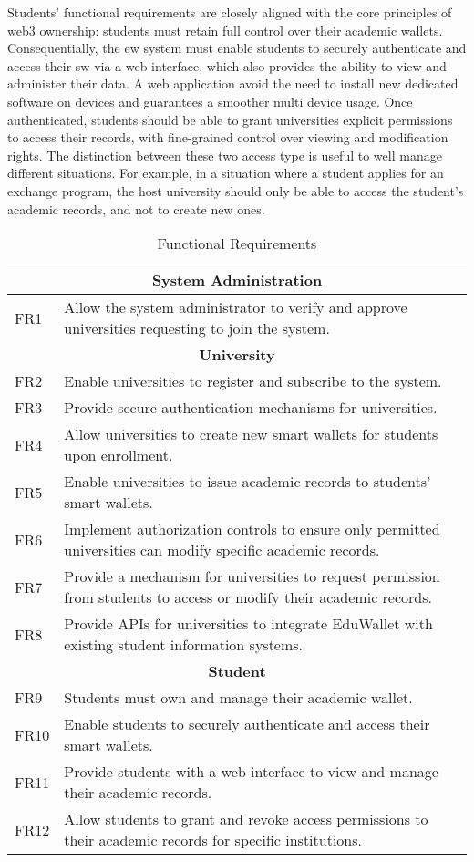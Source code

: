 Students' functional requirements are closely aligned with the core principles of \Gls{web3} ownership: students must retain full control over their academic wallets. Consequentially, the \acrshort{ew} system must enable students to securely authenticate and access their \acrshort{sw} via a web interface, which also provides the ability to view and administer their data. A web application avoid the need to install new dedicated software on devices and guarantees a smoother multi device usage. Once authenticated, students should be able to grant universities explicit permissions to access their records, with fine-grained control over viewing and modification rights. The distinction between these two access type is useful to well manage different situations. For example, in a situation where a student applies for an exchange program, the host university should only be able to access the student's academic records, and not to create new ones.

\begin{table}
\centering
\caption{Functional Requirements}
\label{tab:funcReq}
\begin{tabular}{|p{1.0cm}|p{11cm}|}
\hline
\multicolumn{2}{|c|}{\textbf{System Administration}} \\
\hline
FR1 & Allow the system administrator to verify and approve universities requesting to join the system. \\
\hline
\multicolumn{2}{|c|}{\textbf{University}} \\
\hline
FR2 & Enable universities to register and subscribe to the system. \\
FR3 & Provide secure authentication mechanisms for universities. \\
FR4 & Allow universities to create new smart wallets for students upon enrollment. \\
FR5 & Enable universities to issue academic records to students' smart wallets. \\
FR6 & Implement authorization controls to ensure only permitted universities can modify specific academic records. \\
FR7 & Provide a mechanism for universities to request permission from students to access or modify their academic records. \\
FR8 & Provide APIs for universities to integrate EduWallet with existing student information systems. \\
\hline
\multicolumn{2}{|c|}{\textbf{Student}} \\
\hline
FR9  & Students must own and manage their academic wallet. \\
FR10 & Enable students to securely authenticate and access their smart wallets. \\
FR11 & Provide students with a web interface to view and manage their academic records. \\
FR12 & Allow students to grant and revoke access permissions to their academic records for specific institutions. \\
\hline
\end{tabular}
\end{table}

